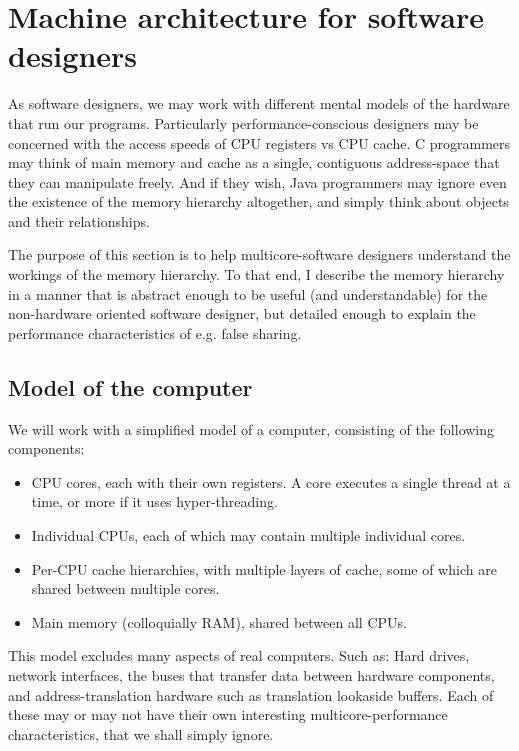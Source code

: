 \chapter{Machine architecture for software designers}
As software designers, we may work with different mental models of the hardware
that run our programs. Particularly performance-conscious designers may be
concerned with the access speeds of CPU registers vs CPU cache. C programmers
may think of main memory and cache as a single, contiguous address-space that
they can manipulate freely. And if they wish, Java programmers may ignore even
the existence of the memory hierarchy altogether, and simply think about objects
and their relationships.

The purpose of this section is to help multicore-software designers understand the
workings of the memory hierarchy. To that end, I describe the memory hierarchy
in a manner that is abstract enough to be useful (and understandable) for the
non-hardware oriented software designer, but detailed enough to explain the
performance characteristics of e.g. false sharing.

\section{Model of the computer}
We will work with a simplified model of a computer, consisting of the following
components:

\begin{itemize}
	\item CPU cores, each with their own registers. A core executes a single
		thread at a time, or more if it uses hyper-threading.
	\item Individual CPUs, each of which may contain multiple individual cores.
	\item Per-CPU cache hierarchies, with multiple layers of cache,
		some of which are shared between multiple cores.
	\item Main memory (colloquially RAM), shared between all CPUs.
\end{itemize}


This model excludes many aspects of real computers. Such as: Hard drives,
network interfaces, the buses that transfer data between hardware components,
and address-translation hardware such as translation lookaside buffers. Each of
these may or may not have their own interesting multicore-performance
characteristics, that we shall simply ignore.

